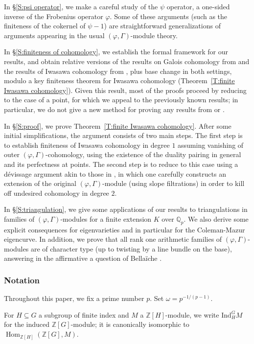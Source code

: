 \documentclass[12pt]{article}
\theoremstyle{definition}
\numberwithin{equation}{theorem}
\newcommand{\QQ}{\mathbb{Q}}
\newcommand{\ZZ}{\mathbb{Z}}
\newcommand{\Ind}{\mathrm{Ind}}
\def\Qp{\QQ_p}
\DeclareMathOperator{\Hom}{Hom}
\begin{document}
In \S\ref{S:psi operator}, we make a careful study of the
$\psi$ operator, a one-sided inverse of the Frobenius operator $\varphi$.
Some of these arguments (such as the finiteness of the cokernel of
$\psi-1$)
are straightforward generalizations of arguments appearing in the
usual $(\varphi, \Gamma)$-module theory.

In \S\ref{S:finiteness of cohomology}, we establish the formal
framework for our results, and obtain
relative versions of the results on Galois cohomology from \cite{liu}
and the results of Iwasawa
cohomology from \cite{pottharst2}, plus base change in both settings,
modulo
a key finiteness theorem  for Iwasawa cohomology
(Theorem~\ref{T:finite Iwasawa cohomology}).
Given this result, most of the proofs proceed by reducing to the case
of a point, for which
we appeal to the previously known results; in particular, we do not
give a new method for
proving any results from \cite{liu} or \cite{pottharst2}.

In \S\ref{S:proof}, we prove Theorem~\ref{T:finite Iwasawa
cohomology}. After some initial simplifications,
the argument consists of two main steps. The first step is to
establish finiteness of Iwasawa cohomology in degree $1$
assuming vanishing of outer $(\varphi,\Gamma)$-cohomology, using the existence of the
duality pairing in general and its
perfectness at points. The second step is to reduce to this case using
a d\'evissage argument akin to those
in \cite{liu}, in which one carefully constructs an extension of the
original $(\varphi, \Gamma)$-module
(using slope filtrations) in order to kill off undesired cohomology in degree $2$.

In \S\ref{S:triangulation}, we give some applications of our results
to triangulations in families
of $(\varphi, \Gamma)$-modules for a finite extension $K$ over $\Qp$.  We also derive some explicit
consequences for eigenvarieties and
in particular for the Coleman-Mazur eigencurve.  In addition, we prove that all rank one arithmetic families of $(\varphi,\Gamma)$-modules are of character type (up to twisting by a line bundle on the base), answering in the affirmative a question of Bella\"iche \cite[\S3,~Question~1]{R:Bellaiche}.

\subsubsection*{Notation}
Throughout this paper, we fix a prime number $p$.  Set $\omega =
p^{-1/(p-1)}$.

For $H \subseteq G$ a subgroup of finite index and $M$ a
$\ZZ[H]$-module, we write $\Ind_H^G M$ for the induced
$\ZZ[G]$-module; it is canonically isomorphic to
$\Hom_{\ZZ[H]}(\ZZ[G], M)$.
\end{document}
